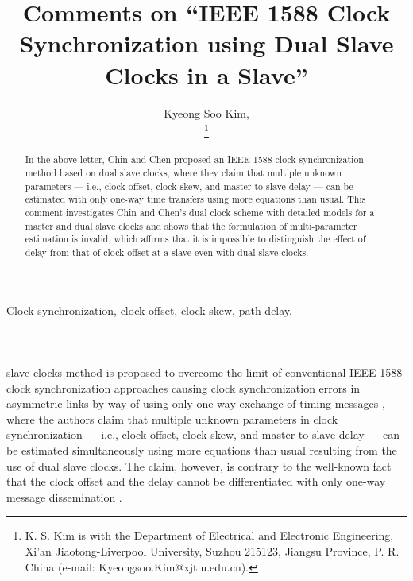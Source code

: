 \documentclass[journal,twoside,final]{IEEEtran}
\begin{document}
\title{\LARGE Comments on ``IEEE 1588 Clock Synchronization using Dual Slave
  Clocks in a Slave''}

\author{Kyeong Soo Kim, \\
  \thanks{K. S. Kim is with the Department of Electrical and Electronic
    Engineering, Xi'an Jiaotong-Liverpool University, Suzhou 215123, Jiangsu
    Province, P. R. China (e-mail: Kyeongsoo.Kim@xjtlu.edu.cn).}}

\maketitle


\begin{abstract}
  In the above letter, Chin and Chen proposed an IEEE 1588 clock synchronization
  method based on dual slave clocks, where they claim that multiple unknown
  parameters --- i.e., clock offset, clock skew, and master-to-slave delay ---
  can be estimated with only one-way time transfers using more equations than
  usual. This comment investigates Chin and Chen's dual clock scheme with
  detailed models for a master and dual slave clocks and shows that the
  formulation of multi-parameter estimation is invalid, which affirms that it is
  impossible to distinguish the effect of delay from that of clock offset at a
  slave even with dual slave clocks.
\end{abstract}

\begin{IEEEkeywords}
  Clock synchronization, clock offset, clock skew, path delay.
\end{IEEEkeywords}

\section*{\(~\)}
\label{sec-1}
 slave clocks method is proposed to overcome the limit of
conventional IEEE 1588 clock synchronization approaches causing clock
synchronization errors in asymmetric links by way of using only one-way exchange
of timing messages \cite{chin09:_ieee}, where the authors claim that multiple
unknown parameters in clock synchronization --- i.e., clock offset, clock skew,
and master-to-slave delay --- can be estimated simultaneously using more
equations than usual resulting from the use of dual slave clocks. The claim,
however, is contrary to the well-known fact that the clock offset and the delay
cannot be differentiated with only one-way message dissemination
\cite{wu11:_clock_synch_wirel_sensor_networ}.
\end{document}
